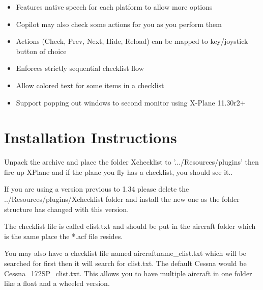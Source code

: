 \documentclass[11pt,parskip=half,a4paper]{scrartcl}
\begin{document}
\begin{itemize}
\item Features native speech for each platform to allow more options \ \ \ 
\end{itemize}

\begin{itemize}
\item Copilot may also check some actions for you as you perform them
\end{itemize}

\begin{itemize}
\item Actions (Check, Prev, Next, Hide, Reload) can be mapped to key/joystick button of choice
\end{itemize}

\begin{itemize}
\item Enforces strictly sequential checklist flow
\end{itemize}

\begin{itemize}
\item Allow colored text for some items in a checklist
\end{itemize}

\begin{itemize}
\item Support popping out windows to second monitor using X-Plane 11.30r2+
\end{itemize}

\newpage
\section{Installation Instructions}

Unpack the archive and place the folder Xchecklist to '.../Resources/plugins' then fire up XPlane and if the plane you fly has a checklist, you should see it.. \newline

If you are using a version previous to 1.34 please delete the ../Resources/plugins/Xchecklist folder and install the new one as the folder structure has changed with this version. \newline 

The checklist file is called clist.txt and should be put in the aircraft folder which is the same place the *.acf file resides. \newline

You may also have a checklist file named aircraftname\_clist.txt which will be searched for first then it will search for clist.txt. The default Cessna would be Cessna\_172SP\_clist.txt. This allows you to have multiple aircraft in one folder like a float and a wheeled version. \newline
\end{document}
